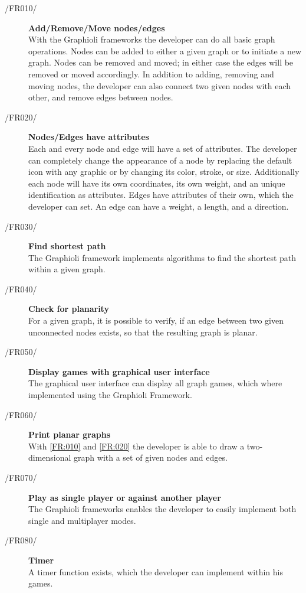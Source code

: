 \begin{description}
  	\item[/FR010/\label{FR:010}] {\bf Add/Remove/Move nodes/edges}  \hfill \\
	With the Graphioli frameworks the developer can do all basic graph operations. Nodes can be added to either a given graph or to initiate a new graph. Nodes can be removed and moved; in either case the edges will be removed or moved accordingly. In addition to adding, removing and moving nodes, the developer can also connect two given nodes with each other, and remove edges between nodes.
	\item[/FR020/\label{FR:020}] {\bf Nodes/Edges have attributes}  \\
	Each and every node and edge will have a set of attributes. The developer can completely change the appearance of a node by replacing the default icon with any graphic or by changing its color, stroke, or size. Additionally each node will have its own coordinates, its own weight, and an unique identification as attributes. Edges have attributes of their own, which the developer can set. An edge can have a weight, a length, and a direction.
	\item[/FR030/\label{FR:030}] {\bf Find shortest path}  \\
	The Graphioli framework implements algorithms to find the shortest path within a given graph.
	\item[/FR040/\label{FR:040}] {\bf  Check for planarity}  \\
	For a given graph, it is possible to verify, if an edge between two given unconnected nodes exists, so that the resulting graph is planar.
 	\item[/FR050/\label{FR:050}] {\bf Display games with graphical user interface}  \\
 	The graphical user interface  can display all graph games, which where implemented using the Graphioli Framework.
	\item[/FR060/\label{FR:060}] {\bf Print planar graphs}  \\
  	With \ref{FR:010} and \ref{FR:020} the developer is able to draw a two-dimensional graph with a set of given nodes and edges.
	\item[/FR070/\label{FR:070}] {\bf Play as single player or against another player}  \\
	The Graphioli frameworks enables the developer to easily implement both single and multiplayer modes.
	\item[/FR080/\label{FR:080}] {\bf Timer} \\
	A timer function exists, which the developer can implement within his games.
\end{description}

